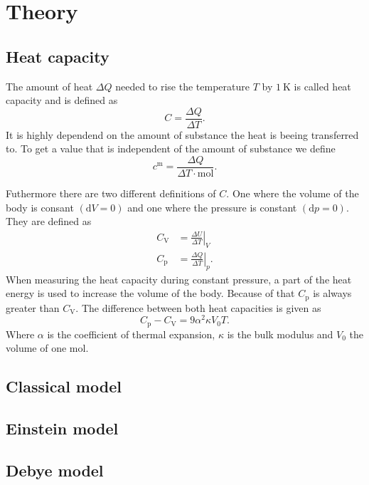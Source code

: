 \section{Theory}
\label{sec:Theory}

\subsection{Heat capacity}
\label{ssec:theory1}

The amount of heat $\Delta Q$ needed to rise the temperature $T$ by $\SI{1}{\kelvin}$ is called heat capacity and is defined as
\begin{equation}
    C = \frac{\Delta Q}{\Delta T}.
    \label{eq:heat}
\end{equation}
It is highly dependend on the amount of substance the heat is beeing transferred to.
To get a value that is independent of the amount of substance we define
\begin{equation}
    c^{\text{m}} = \frac{\Delta Q}{\Delta T \cdot \si{\mol}}.
    \label{eq:heat_mole}
\end{equation}

Futhermore there are two different definitions of $C$.
One where the volume of the body is consant $(\mathrm{d} V = 0)$ and one where the pressure is constant $(\mathrm{d} p = 0)$.
They are defined as 
\begin{align}
    C_\text{V} &= \left. \frac{\Delta U}{\Delta T} \right\vert_{V}\\
    C_\text{p} &= \left. \frac{\Delta Q}{\Delta T} \right\vert_{p}.
\end{align}
When measuring the heat capacity during constant pressure, a part of the heat energy is used to increase the volume of the body.
Because of that $C_\text{p}$ is always greater than $C_\text{V}$.
The difference between both heat capacities is given as
\begin{equation}
    C_\text{p} - C_\text{V} = 9 \alpha ^2 \kappa V_\text{0} T.
    \label{eq:heat_dif}
\end{equation}
Where $\alpha$ is the coefficient of thermal expansion, $\kappa$ is the bulk modulus and $V_\text{0}$ the volume of one mol.

\subsection{Classical model}
\label{ssec:theory2}

\subsection{Einstein model}
\label{ssec:theory3}

\subsection{Debye model}
\label{ssec:theory4}